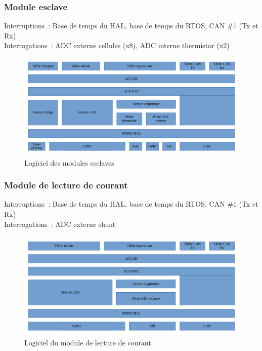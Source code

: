 	\subsubsection{Module esclave}
		\noindent
		Interruptions : Base de temps du HAL, base de temps du RTOS, CAN \#1 (Tx et Rx) \\
		Interrogations : ADC externe cellules (x8), ADC interne thermistor (x2)
		\begin{figure}[H]
			\centering
			\includegraphics[scale=0.5]{Images/Logiciel_Slave.png}
			\caption{Logiciel des modules esclaves}
			\label{fig:logiciel_slave}
		\end{figure}
	\subsubsection{Module de lecture de courant}
		\noindent
		Interruptions : Base de temps du HAL, base de temps du RTOS, CAN \#1 (Tx et Rx) \\
		Interrogations : ADC externe shunt
		\begin{figure}[H]
			\centering
			\includegraphics[scale=0.5]{Images/Logiciel_Current_Sense.png}
			\caption{Logiciel du module de lecture de courant}
			\label{fig:logiciel_current_sense}
		\end{figure}
